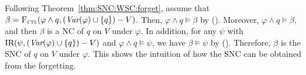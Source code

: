 \documentclass{article}
\begin{document}


Following Theorem~\ref{thm:SNC:WSC:forget}, assume that $\beta = {\textsc{F}_{\textsc{ctl}}}(\varphi \wedge q, (\textit{Var}(\varphi) \cup \{q\})- V)$.  Then, $\varphi \wedge q \models \beta$  by (\W). Moreover,  $\varphi \wedge q \models \beta$,  and then $\beta$ is a NC of $q$ on $V$ under $\varphi$.
In addition, for any $\psi$ with $\textrm{IR}(\psi, (\textit{Var}(\varphi) \cup \{q\})- V)$ and $\varphi \wedge q \models \psi$, %
we have $\beta \models \psi$ by (\PP). Therefore, $\beta$ is the SNC of $q$ on $V$ under $\varphi$. This shows the intuition of how the SNC can be obtained from the forgetting.
\end{document}
